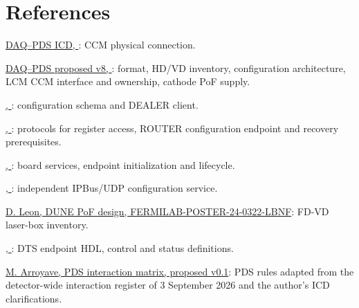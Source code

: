 \section*{References}
\begingroup\small
\begin{description}[leftmargin=3em,style=nextline,itemsep=0.15em,parsep=0pt]
\item[R1] \href{https://github.com/marroyav/daphne-icd/tree/26214716ce5ab19f3ec68bd2a6370552c48bd650}{DAQ--PDS ICD, }: CCM physical connection.
\item[R2] \href{https://github.com/marroyav/daphne-icd/tree/6c0b24542f9b2504037aa895250d1441ee209fd2}{DAQ--PDS proposed v8, }: format, HD/VD inventory, configuration architecture, LCM CCM interface and ownership, cathode PoF supply.
\item[R3] \href{https://github.com/DUNE-DAQ/daphnemodules/tree/edf75a0c5f37cb6d1ef889723359e23e746ffe2b}{, }: configuration schema and DEALER client.
\item[R4] \href{https://github.com/DUNE-DAQ/daphne-os/tree/e31bdfbfcc177c06458a5a05189e91a3b17fc7d5/daphne-server}{, }: protocols for register access, ROUTER configuration endpoint and recovery prerequisites.
\item[R5] \href{https://github.com/DUNE-DAQ/daphne-os/tree/e31bdfbfcc177c06458a5a05189e91a3b17fc7d5/petalinux}{, }: board services, endpoint initialization and lifecycle.
\item[R6] \href{https://github.com/DUNE-DAQ/hermesmodules/tree/887d5fc06b85d97ebb654f6a73baa87d8078fa3f}{, }: independent IPBus/UDP configuration service.
\item[R7] \href{https://lss.fnal.gov/archive/2024/poster/fermilab-poster-24-0322-lbnf.pdf}{D. Leon, DUNE PoF design, FERMILAB-POSTER-24-0322-LBNF}: FD-VD laser-box inventory.
\item[R8] \href{https://github.com/DUNE-DAQ/daphne-firmware/tree/1f10fc012985bed9013d83f87d5c25d2cdb5a960/ip_repo/daphne_ip/rtl/timing}{, }: DTS endpoint HDL, control and status definitions.
\item[R9] \href{https://github.com/marroyav/icd-sc-pds/blob/main/references/pds-interaction-matrix-v0.1.csv}{M. Arroyave, PDS interaction matrix, proposed v0.1}: PDS rules adapted from the detector-wide interaction register of 3 September 2026 and the author's ICD clarifications.
\end{description}
\endgroup
